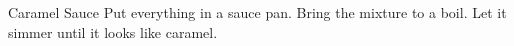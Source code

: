 \documentclass[../cookbook.tex]{subfiles}
\begin{document}
\begin{recipe}{Caramel Sauce}{}{}
    Put everything in a sauce pan. Bring the mixture to a boil.
    Let it simmer until it looks like caramel.
\end{recipe}
\end{document}
